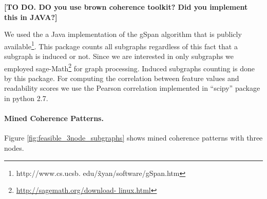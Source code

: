 \textbf{[TO DO. DO you use brown coherence toolkit? Did you implement this in JAVA?]}

We used the a Java implementation of the gSpan algorithm that is publicly available\footnote{http://www.cs.ucsb. edu/\~xyan/software/gSpan.htm}. 
This package counts all subgraphs regardless of this fact that a subgraph is induced or not. 
Since we are interested in only subgraphs we employed sage-Math\footnote{\url{http://sagemath.org/download- linux.html}} for graph processing. 
Induced subgraphs counting is done by this package. 
For computing the correlation between feature values and readability scores we use the Pearson correlation implemented in ``scipy'' package in python 2.7. 


\paragraph{Mined Coherence Patterns.} 
Figure \ref{fig:feasible_3node_subgraphs} shows mined coherence patterns with three nodes. 
